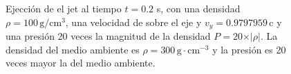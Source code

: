 \documentclass[12pt,a4paper]{book}
\begin{document}
\begin{figure} %
\centering
{}
\caption{\label{fig:jet_ma_300}Ejección de el jet al tiempo $t = 0.2$ s, con una densidad  $\rho = 100 \, \mathrm{g}/\mathrm{cm}^3$, una velocidad de sobre el eje y $v_y = 0.9797959 \, \mathrm{c}$  y una presión 20 veces la  magnitud de la densidad $P = 20 \times \vert \rho \vert$. La densidad del medio ambiente es $\rho = 300 \, \mathrm{g} \cdot \mathrm{cm}^{-3}$ y la presión es 20 veces mayor la del medio ambiente.}
\end{figure}
\end{document}
